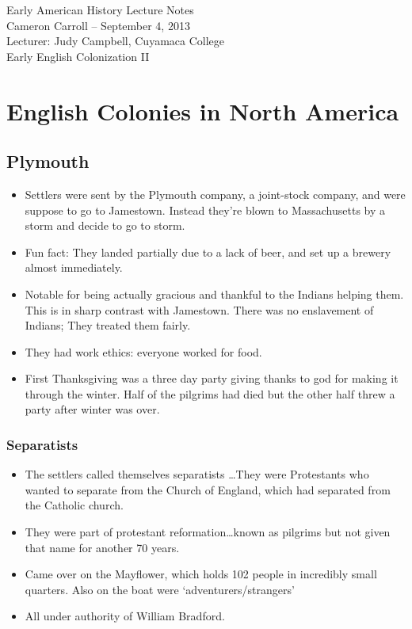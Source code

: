 \documentclass{article}
\begin{document}
  
  \begin{center}
    {\small{} Early American History Lecture Notes} \\[0.6cm]
    {\small{} Cameron Carroll -- September 4, 2013} \\[0.6cm]
    {\small{} Lecturer: Judy Campbell, Cuyamaca College}\\[1cm]
    {\small{} Early English Colonization II}\\[1cm]
  \end{center}
  
  \tableofcontents
  \newpage
  
  \section{English Colonies in North America}
    \subsection{Plymouth}
      \begin{itemize}
        \item Settlers were sent by the Plymouth company, a joint-stock company, and were suppose to go to Jamestown. Instead they're blown to Massachusetts by a storm and decide to go to storm.
        \item Fun fact: They landed partially due to a lack of beer, and set up a brewery almost immediately.
        \item Notable for being actually gracious and thankful to the Indians helping them. This is in sharp contrast with Jamestown. There was no enslavement of Indians; They treated them fairly. 
        \item They had work ethics: everyone worked for food.
        \item First Thanksgiving was a three day party giving thanks to god for making it through the winter. Half of the pilgrims had died but the other half threw a party after winter was over.
      \end{itemize}

      \subsubsection{Separatists}
        \begin{itemize}
          \item The settlers called themselves separatists \ldots They were Protestants who wanted to separate from the Church of England, which had separated from the Catholic church.
          \item They were part of protestant reformation\ldots known as pilgrims but not given that name for another 70 years.
          \item Came over on the Mayflower, which holds 102 people in incredibly small quarters. Also on the boat were `adventurers/strangers'
          \item All under authority of William Bradford. 
        \end{itemize}
\end{document}
